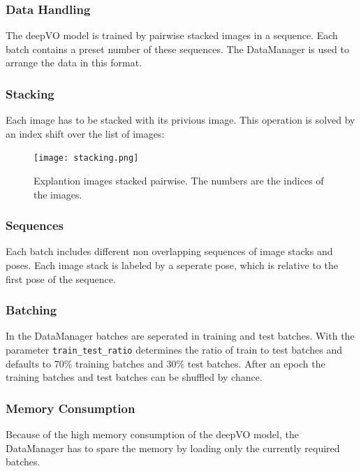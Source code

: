 \documentclass[a4paper,11pt]{article}
\begin{document}
\subsubsection{Data Handling}

The deepVO model is trained by pairwise stacked images in a sequence. Each batch contains a preset number of these sequences. The DataManager is used to arrange the data in this format.

\subsubsection{Stacking}
Each image has to be stacked with its privious image. This operation is solved by an index shift over the list of images:


\begin{figure}[tbh]
    \centering
    \texttt{[image: stacking.png]}
    \caption{Explantion images stacked pairwise. The numbers are the indices of the images.}
    \label{fig:reference_frame}
\end{figure}

\subsubsection{Sequences}
Each batch includes different non overlapping sequences of image stacks and
poses. Each image stack is labeled by a seperate pose, which is relative to the
first pose of the sequence.

\subsubsection{Batching}
In the DataManager batches are seperated in training and test batches. With the
parameter \texttt{train\_test\_ratio} determines the ratio of train to test
batches and defaults to 70\% training batches and 30\% test batches. After an
epoch the training batches and test batches can be shuffled by chance.

\subsubsection{Memory Consumption}
Because of the high memory consumption of the deepVO model, the DataManager has
to spare the memory by loading only the currently required batches.
\end{document}
